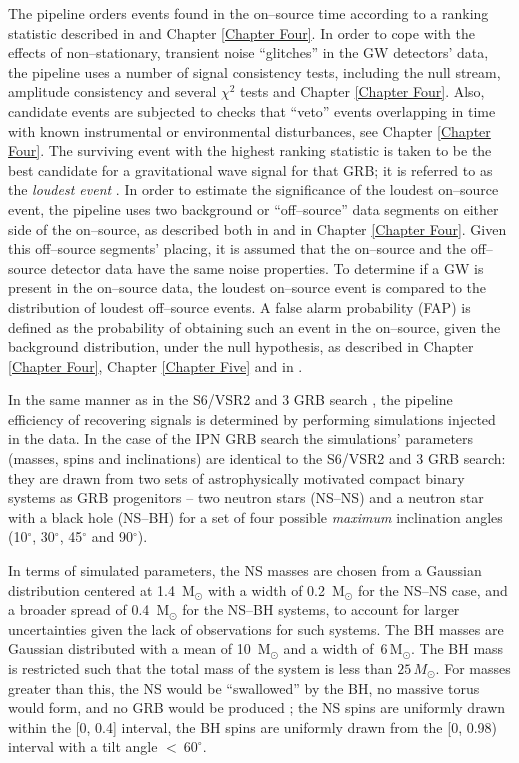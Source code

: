 The pipeline orders events found in the on--source time according to a ranking statistic described in \cite{Harry:2010fr} and Chapter \ref{Chapter Four}. In order to cope with the effects of non--stationary, transient noise ``glitches'' in the GW detectors' data, the pipeline uses a number of signal consistency tests, including the null stream, amplitude consistency and several $\chi^{2}$ tests \cite{Allen:2004gu, Harry:2010fr, Hanna:2008} and Chapter \ref{Chapter Four}. Also, candidate events are subjected to checks that ``veto'' events overlapping in time with known instrumental or environmental disturbances, see Chapter \ref{Chapter Four}. The surviving event with the highest ranking statistic is taken to be the best candidate for a gravitational wave signal for that GRB; it is referred to as the {\it loudest event} \cite{Brady:2004gt,Biswas:2007ni}. In order to estimate the significance of the loudest on--source event, the pipeline uses two background or ``off--source'' data segments on either side of the on--source, as described both in \cite{lvc:s6grb} and in Chapter \ref{Chapter Four}. Given this off--source segments' placing, it is assumed that the on--source and the off--source detector data have the same noise properties. To determine if a GW is present in the on--source data, the loudest on--source event is compared to the distribution of loudest off--source events. A false alarm probability (FAP) is defined as the probability of obtaining such an event in the on--source, given the background distribution, under the null hypothesis, as described in Chapter \ref{Chapter Four}, Chapter \ref{Chapter Five} and in \cite{lvc:s6grb}.

In the same manner as in the S6/VSR2 and 3 GRB search \cite{lvc:s6grb}, the pipeline efficiency of recovering signals is determined by performing simulations injected in the data. In the case of the IPN GRB search the simulations' parameters (masses, spins and inclinations) are identical to the S6/VSR2 and 3 GRB search: they are drawn from two sets of astrophysically motivated compact binary systems as GRB progenitors -- two neutron stars (NS--NS) and a neutron star with a black hole (NS--BH) for a set of four possible \emph{maximum} inclination angles (10$^\circ$, 30$^\circ$, 45$^\circ$ and 90$^\circ$).

In terms of simulated parameters, the NS masses are chosen from a Gaussian distribution centered at 1.4~$\mathrm{M_\odot}$ \cite{Kiziltan:2010ct,Ozel:2012ax} with a width of 0.2~$\mathrm{M_\odot}$ for the NS--NS case, and a broader spread of 0.4~$\mathrm{M_\odot}$ for the NS--BH systems, to account for larger uncertainties given the lack of observations for such systems. The BH masses are Gaussian distributed with a mean of 10~$\mathrm{M_\odot}$ and a width of~6\,$\mathrm{M_\odot}$. The BH mass is restricted such that the total mass of the system is less than $25\,M_{\odot}$. For masses greater than this, the NS would be ``swallowed'' by the BH, no massive torus would form, and no GRB would be produced \cite{Ferrari:2009bw,0264-9381-27-11-114002,lrr-2011-6}; the NS spins are uniformly drawn within the [0, 0.4] interval, the BH spins are uniformly drawn from the [0, 0.98) interval with a tilt angle $<~60^\circ$.


